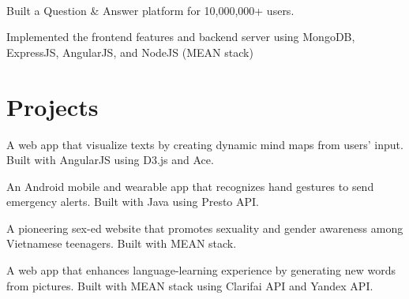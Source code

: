 \documentclass[]{hieudo-build}
\begin{document}
\begin{minipage}[t]{0.65\textwidth}
 \\
\begin{tightemize}
\item Built a Question \& Answer platform for 10,000,000+ users.
\item Implemented the frontend features and backend server using MongoDB, ExpressJS, AngularJS, and NodeJS (MEAN stack)
\end{tightemize}
\sectionsep



\section{Projects}
\descript{}
A web app that visualize texts by creating dynamic mind maps from users' input. Built with AngularJS using D3.js and Ace.
\sectionsep

\descript{}
An Android mobile and wearable app that recognizes hand gestures to send emergency alerts. Built with Java using Presto API.
\sectionsep 

\descript{}
A pioneering sex-ed website that promotes sexuality and gender awareness among Vietnamese teenagers. Built with MEAN stack.
\sectionsep

\descript{}
A web app that enhances language-learning experience by generating new words from pictures. Built with MEAN stack using Clarifai API and Yandex API.
\sectionsep 

\end{minipage} 
\end{document}
